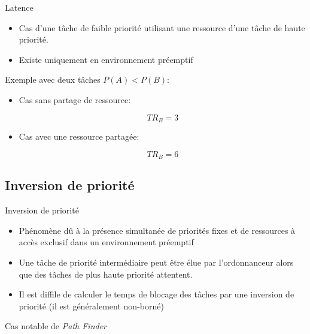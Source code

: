 \begin{frame}{Latence}
  \begin{itemize} 
  \item  Cas d'une tâche  de faible  priorité utilisant  une ressource
    d'une tâche de haute priorité.
  \item Existe uniquement en environnement préemptif
  \end{itemize} 
  Exemple avec deux tâches $P(A) < P(B)$:
  \begin{itemize} 
  \item Cas sans partage de ressource:
    \begin{center}
      $$TR_B = 3$$
    \end{center}
  \item Cas avec une ressource partagée:
    \begin{center}
      $$TR_B = 6$$
    \end{center}
  \end{itemize} 
    
\end{frame} 

\subsection{Inversion de priorité}

\begin{frame}{Inversion de priorité}
  \begin{itemize} 
  \item Phénomène dû à la présence simultanée de priorités fixes et de
    ressources à accès exclusif dans un environnement préemptif
  \item  Une  tâche  de  priorité  intermédiaire peut  être  élue  par
    l'ordonnanceur  alors  que  des  tâches  de  plus  haute  priorité
    attentent.
  \item Il est diffile de calculer  le temps de blocage des tâches par
    une inversion de priorité (il est généralement non-borné)
  \end{itemize} 
  Cas notable de \emph{Path Finder}
\end{frame}

